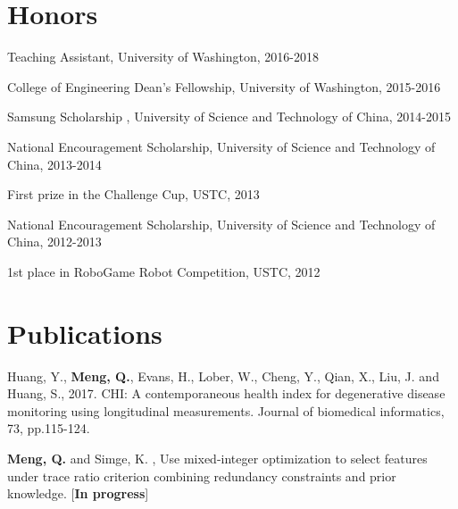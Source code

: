 \documentclass[margin,line,11pt]{resume}
\begin{document}
\begin{resume}

 
     


        \section{\mysidestyle Honors}
        \begin{list2}
        \item {Teaching Assistant, University of Washington, 2016-2018}
                \item {College of Engineering Dean's Fellowship, University of Washington, 2015-2016}          
        \item {Samsung Scholarship , University of Science and Technology of China, 2014-2015}
        \item {National Encouragement Scholarship, University of Science and Technology of China, 2013-2014}
        \item {First prize in the Challenge Cup, USTC, 2013}          
        \item {National Encouragement Scholarship, University of Science and Technology of China, 2012-2013}          
        \item {1st place in RoboGame Robot Competition, USTC, 2012}
        \end{list2}

        \section{\mysidestyle Publications}
        Huang, Y., \textbf{Meng, Q.}, Evans, H., Lober, W., Cheng, Y., Qian, X., Liu, J. and Huang, S., 2017. CHI: A contemporaneous health index for degenerative disease monitoring using longitudinal measurements. Journal of biomedical informatics, 73, pp.115-124.\par
       \textbf{Meng, Q.} and Simge, K. , Use mixed-integer optimization to select features under trace ratio criterion combining redundancy constraints and prior knowledge. [\textbf{In progress}]
        

\end{resume}
\end{document}

